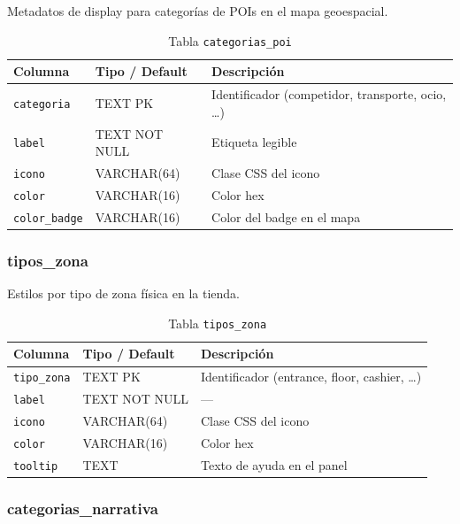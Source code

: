 \documentclass[12pt, a4paper]{article}
\begin{document}
Metadatos de display para categorías de POIs en el mapa geoespacial.

\begin{table}[H]
\centering
\renewcommand{\arraystretch}{1.2}
\begin{tabular}{llp{5.5cm}}
\toprule
\textbf{Columna} & \textbf{Tipo / Default} & \textbf{Descripción} \\
\midrule
\texttt{categoria}    & TEXT PK        & Identificador (competidor, transporte, ocio, \ldots) \\
\texttt{label}        & TEXT NOT NULL  & Etiqueta legible \\
\texttt{icono}        & VARCHAR(64)    & Clase CSS del icono \\
\texttt{color}        & VARCHAR(16)    & Color hex \\
\texttt{color\_badge} & VARCHAR(16)    & Color del badge en el mapa \\
\bottomrule
\end{tabular}
\caption{Tabla \texttt{categorias\_poi}}
\end{table}

\subsubsection{tipos\_zona}

Estilos por tipo de zona física en la tienda.

\begin{table}[H]
\centering
\renewcommand{\arraystretch}{1.2}
\begin{tabular}{llp{5.5cm}}
\toprule
\textbf{Columna} & \textbf{Tipo / Default} & \textbf{Descripción} \\
\midrule
\texttt{tipo\_zona} & TEXT PK       & Identificador (entrance, floor, cashier, \ldots) \\
\texttt{label}      & TEXT NOT NULL & — \\
\texttt{icono}      & VARCHAR(64)   & Clase CSS del icono \\
\texttt{color}      & VARCHAR(16)   & Color hex \\
\texttt{tooltip}    & TEXT          & Texto de ayuda en el panel \\
\bottomrule
\end{tabular}
\caption{Tabla \texttt{tipos\_zona}}
\end{table}

\subsubsection{categorias\_narrativa}
\end{document}

